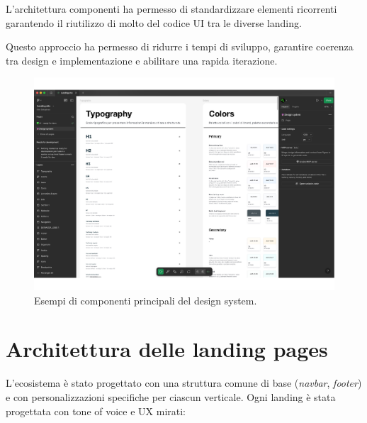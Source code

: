 L'architettura componenti ha permesso di standardizzare elementi ricorrenti garantendo il riutilizzo di molto del codice UI tra le diverse landing.

Questo approccio ha permesso di ridurre i tempi di sviluppo, garantire coerenza tra design e implementazione e abilitare una rapida iterazione.

\begin{figure}[h!]
    \centering
    \includegraphics[width=\textwidth]{chapters/figures/design-system.pdf}
    \caption{Esempi di componenti principali del design system.}
    \label{fig:design-system}
\end{figure}

\section{Architettura delle landing pages}
L'ecosistema è stato progettato con una struttura comune di base (\textit{navbar}, 
\textit{footer}) e con personalizzazioni specifiche per ciascun verticale. 
Ogni landing è stata progettata con tone of voice e UX mirati:

